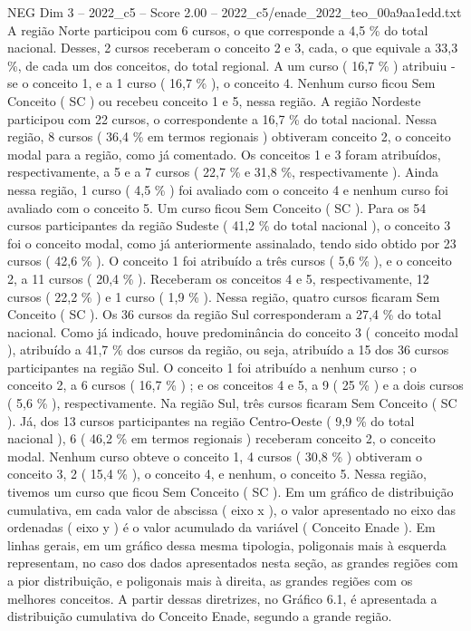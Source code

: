 \begin{textsample}{NEG Dim 3 – 2022\_c5 – Score 2.00 – 2022\_c5/enade\_2022\_teo\_00a9aa1edd.txt}
A região Norte participou com 6 cursos, o que corresponde a 4,5 \% do total nacional.
Desses, 2 cursos receberam o conceito 2 e 3, cada, o que equivale a 33,3 \%, de cada um dos conceitos, do total regional.
A um curso ( 16,7 \% ) atribuiu -se o conceito 1, e a 1 curso ( 16,7 \% ), o conceito 4.
Nenhum curso ficou Sem Conceito ( SC ) ou recebeu conceito 1 e 5, nessa região.
A região Nordeste participou com 22 cursos, o correspondente a 16,7 \% do total nacional.
Nessa região, 8 cursos ( 36,4 \% em termos regionais ) obtiveram conceito 2, o conceito modal para a região, como já comentado.
Os conceitos 1 e 3 foram atribuídos, respectivamente, a 5 e a 7 cursos ( 22,7 \% e 31,8 \%, respectivamente ).
Ainda nessa região, 1 curso ( 4,5 \% ) foi avaliado com o conceito 4 e nenhum curso foi avaliado com o conceito 5.
Um curso ficou Sem Conceito ( SC ).
Para os 54 cursos participantes da região Sudeste ( 41,2 \% do total nacional ), o conceito 3 foi o conceito modal, como já anteriormente assinalado, tendo sido obtido por 23 cursos ( 42,6 \% ).
O conceito 1 foi atribuído a três cursos ( 5,6 \% ), e o conceito 2, a 11 cursos ( 20,4 \% ).
Receberam os conceitos 4 e 5, respectivamente, 12 cursos ( 22,2 \% ) e 1 curso ( 1,9 \% ).
Nessa região, quatro cursos ficaram Sem Conceito ( SC ).
Os 36 cursos da região Sul corresponderam a 27,4 \% do total nacional.
Como já indicado, houve predominância do conceito 3 ( conceito modal ), atribuído a 41,7 \% dos cursos da região, ou seja, atribuído a 15 dos 36 cursos participantes na região Sul.
O conceito 1 foi atribuído a nenhum curso ; o conceito 2, a 6 cursos ( 16,7 \% ) ; e os conceitos 4 e 5, a 9 ( 25 \% ) e a dois cursos ( 5,6 \% ), respectivamente.
Na região Sul, três cursos ficaram Sem Conceito ( SC ).
Já, dos 13 cursos participantes na região Centro-Oeste ( 9,9 \% do total nacional ), 6 ( 46,2 \% em termos regionais ) receberam conceito 2, o conceito modal.
Nenhum curso obteve o conceito 1, 4 cursos ( 30,8 \% ) obtiveram o conceito 3, 2 ( 15,4 \% ), o conceito 4, e nenhum, o conceito 5.
Nessa região, tivemos um curso que ficou Sem Conceito ( SC ).
Em um gráfico de distribuição cumulativa, em cada valor de abscissa ( eixo x ), o valor apresentado no eixo das ordenadas ( eixo y ) é o valor acumulado da variável ( Conceito Enade ).
Em linhas gerais, em um gráfico dessa mesma tipologia, poligonais mais à esquerda representam, no caso dos dados apresentados nesta seção, as grandes regiões com a pior distribuição, e poligonais mais à direita, as grandes regiões com os melhores conceitos.
A partir dessas diretrizes, no Gráfico 6.1, é apresentada a distribuição cumulativa do Conceito Enade, segundo a grande região.

\end{textsample}
